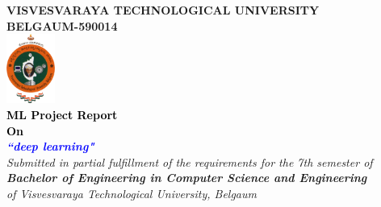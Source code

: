 \thispagestyle{empty}
\begin{titlepage}
\begin{center}
\textup{\large{\textcolor{darkbrown}{\bf VISVESVARAYA TECHNOLOGICAL UNIVERSITY} \\ {\textcolor{darkbrown}{\bf BELGAUM-590014}}}}\\
\includegraphics[width=0.12\textwidth]{./../static/media/VTU.png}\\
\textup{\small{\textcolor{black}{\textbf{ML Project Report} \\ {\textbf{On}}}}} \\
\textup{\large{\textcolor{blue}{\textbf{\textit{``deep learning"}}}}} \\[0.2in]

\textup{{\textit {Submitted in partial fulfillment of the requirements for the 7th semester of} \\ {\textbf {\textit {Bachelor of Engineering in Computer Science and Engineering}} \\ \textit {of Visvesvaraya Technological University, Belgaum}}}}\\


\end{center}
\end{titlepage}

